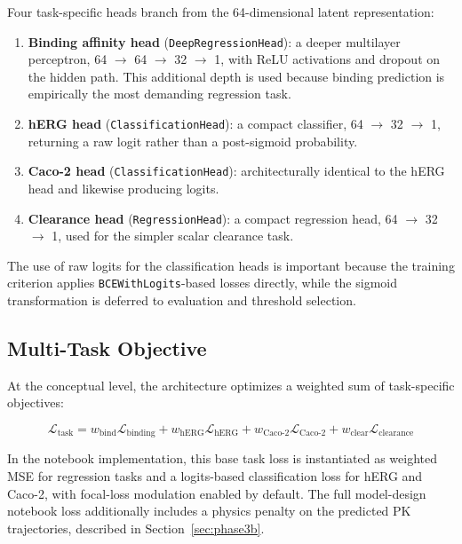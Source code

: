 \documentclass[a4paper,11pt,twoside]{report}
\begin{document}
Four task-specific heads branch from the 64-dimensional latent representation:

\begin{enumerate}
\item \textbf{Binding affinity head} (\texttt{DeepRegressionHead}): a deeper multilayer perceptron, 64 $\rightarrow$ 64 $\rightarrow$ 32 $\rightarrow$ 1, with ReLU activations and dropout on the hidden path. This additional depth is used because binding prediction is empirically the most demanding regression task.
\item \textbf{hERG head} (\texttt{ClassificationHead}): a compact classifier, 64 $\rightarrow$ 32 $\rightarrow$ 1, returning a raw logit rather than a post-sigmoid probability.
\item \textbf{Caco-2 head} (\texttt{ClassificationHead}): architecturally identical to the hERG head and likewise producing logits.
\item \textbf{Clearance head} (\texttt{RegressionHead}): a compact regression head, 64 $\rightarrow$ 32 $\rightarrow$ 1, used for the simpler scalar clearance task.
\end{enumerate}

The use of raw logits for the classification heads is important because the training criterion applies \texttt{BCEWithLogits}-based losses directly, while the sigmoid transformation is deferred to evaluation and threshold selection.

\subsection{Multi-Task Objective}

At the conceptual level, the architecture optimizes a weighted sum of task-specific objectives:

\begin{equation}
\mathcal{L}_{\text{task}} = w_{\text{bind}} \mathcal{L}_{\text{binding}} + w_{\text{hERG}} \mathcal{L}_{\text{hERG}} + w_{\text{Caco-2}} \mathcal{L}_{\text{Caco-2}} + w_{\text{clear}} \mathcal{L}_{\text{clearance}}
\label{eq:mtl_loss}
\end{equation}

In the notebook implementation, this base task loss is instantiated as weighted MSE for regression tasks and a logits-based classification loss for hERG and Caco-2, with focal-loss modulation enabled by default. The full model-design notebook loss additionally includes a physics penalty on the predicted PK trajectories, described in Section~\ref{sec:phase3b}.
\end{document}
